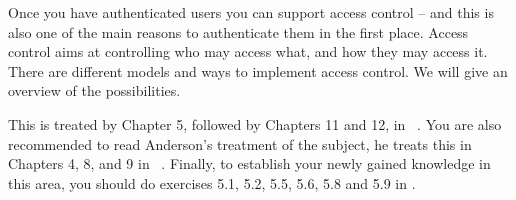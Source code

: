 Once you have authenticated users you can support access control -- and this is 
also one of the main reasons to authenticate them in the first place.
Access control aims at controlling who may access what, and how they may access 
it.
There are different models and ways to implement access control.
We will give an overview of the possibilities.

This is treated by Chapter 5, followed by Chapters 11 and 12, in 
~\cite{Gollmann2011cs}.
You are also recommended to read Anderson's treatment of the subject, he treats 
this in Chapters 4, 8, and 9 in 
~\cite{Anderson2008sea}.
Finally, to establish your newly gained knowledge in this area, you should do 
exercises 5.1, 5.2, 5.5, 5.6, 5.8 and 5.9 in \cite{Gollmann2011cs}.
